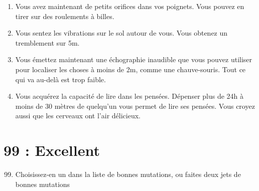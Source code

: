 \documentclass{article}
\begin{document}
\begin{enumerate}
	\item Vous avez maintenant de petits orifices dans vos poignets. Vous pouvez en tirer sur des roulements à billes.
	\item Vous sentez les vibrations sur le sol autour de vous. Vous obtenez un tremblement sur 5m.
	\item Vous émettez maintenant une échographie inaudible que vous pouvez utiliser pour localiser les choses à moins de 2m, comme une chauve-souris. Tout ce qui va au-delà est trop faible.
	\item Vous acquérez la capacité de lire dans les pensées. Dépenser plus de 24h à moins de 30 mètres de quelqu'un vous permet de lire ses pensées. Vous croyez aussi que les cerveaux ont l'air délicieux.
\end{enumerate}

\section*{99 : Excellent}
\begin{enumerate}
	\setcounter{enumi}{98}
	\item Choisissez-en un dans la liste de bonnes mutations, ou faites deux jets de bonnes mutations
\end{enumerate}
\end{document}
